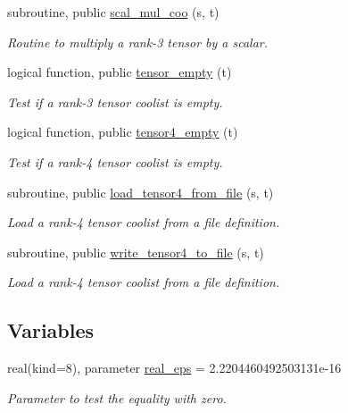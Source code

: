 \begin{DoxyCompactItemize}
subroutine, public \hyperlink{namespacetensor_af105ec6083969c52f5e7422d75a5cda5}{scal\+\_\+mul\+\_\+coo} (s, t)
\begin{DoxyCompactList}\small\item\em Routine to multiply a rank-\/3 tensor by a scalar. \end{DoxyCompactList}\item 
logical function, public \hyperlink{namespacetensor_ab08af814baeb0b670bd5d587ca578239}{tensor\+\_\+empty} (t)
\begin{DoxyCompactList}\small\item\em Test if a rank-\/3 tensor coolist is empty. \end{DoxyCompactList}\item 
logical function, public \hyperlink{namespacetensor_a9b00b4f3cebb865971bcbaf818602ddc}{tensor4\+\_\+empty} (t)
\begin{DoxyCompactList}\small\item\em Test if a rank-\/4 tensor coolist is empty. \end{DoxyCompactList}\item 
subroutine, public \hyperlink{namespacetensor_a373dab2b483b4bc5f521934660d289aa}{load\+\_\+tensor4\+\_\+from\+\_\+file} (s, t)
\begin{DoxyCompactList}\small\item\em Load a rank-\/4 tensor coolist from a file definition. \end{DoxyCompactList}\item 
subroutine, public \hyperlink{namespacetensor_a328cec7eb0ae3c472db0f9ccdd475763}{write\+\_\+tensor4\+\_\+to\+\_\+file} (s, t)
\begin{DoxyCompactList}\small\item\em Load a rank-\/4 tensor coolist from a file definition. \end{DoxyCompactList}\end{DoxyCompactItemize}
\subsection*{Variables}
\begin{DoxyCompactItemize}
\item 
real(kind=8), parameter \hyperlink{namespacetensor_a2a2ab182d86107e62533c3f0043652cc}{real\+\_\+eps} = 2.\+2204460492503131e-\/16
\begin{DoxyCompactList}\small\item\em Parameter to test the equality with zero. \end{DoxyCompactList}\end{DoxyCompactItemize}


